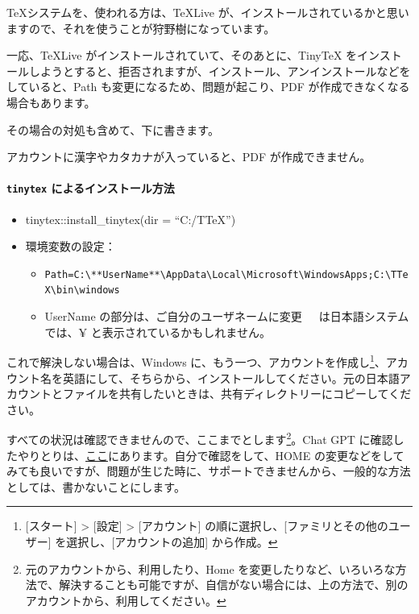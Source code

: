 \documentclass[
]{bxjsbook}
\providecommand{\tightlist}{%
  \setlength{\itemsep}{0pt}\setlength{\parskip}{0pt}}
\theoremstyle{definition}
\theoremstyle{definition}
\theoremstyle{definition}
\theoremstyle{definition}
\theoremstyle{remark}
\begin{document}
\TeX システムを、使われる方は、TeXLive が、インストールされているかと思いますので、それを使うことが狩野樹になっています。

一応、TeXLive がインストールされていて、そのあとに、TinyTeX をインストールしようとすると、拒否されますが、インストール、アンインストールなどをしていると、Path も変更になるため、問題が起こり、PDF が作成できなくなる場合もあります。

その場合の対処も含めて、下に書きます。

アカウントに漢字やカタカナが入っていると、PDF が作成できません。

\hypertarget{tinytex-ux306bux3088ux308bux30a4ux30f3ux30b9ux30c8ux30fcux30ebux65b9ux6cd5}{%
\paragraph{\texorpdfstring{\texttt{tinytex} によるインストール方法}{tinytex によるインストール方法}}\label{tinytex-ux306bux3088ux308bux30a4ux30f3ux30b9ux30c8ux30fcux30ebux65b9ux6cd5}}

\begin{itemize}
\tightlist
\item
  tinytex::install\_tinytex(dir = ``C:/TTeX'')
\item
  環境変数の設定：

  \begin{itemize}
  \tightlist
  \item
    \texttt{Path=C:\textbackslash{}**UserName**\textbackslash{}AppData\textbackslash{}Local\textbackslash{}Microsoft\textbackslash{}WindowsApps;C:\textbackslash{}TTeX\textbackslash{}bin\textbackslash{}windows}
  \item
    UserName の部分は、ご自分のユーザネームに変更　~は日本語システムでは、¥ と表示されているかもしれません。
  \end{itemize}
\end{itemize}

これで解決しない場合は、Windows に、もう一つ、アカウントを作成し\footnote{{[}スタート{]} \textgreater{} {[}設定{]} \textgreater{} {[}アカウント{]} の順に選択し、{[}ファミリとその他のユーザー{]} を選択し、{[}アカウントの追加{]} から作成。}、アカウント名を英語にして、そちらから、インストールしてください。元の日本語アカウントとファイルを共有したいときは、共有ディレクトリーにコピーしてください。

すべての状況は確認できませんので、ここまでとします\footnote{元のアカウントから、利用したり、Home を変更したりなど、いろいろな方法で、解決することも可能ですが、自信がない場合には、上の方法で、別のアカウントから、利用してください。}。Chat GPT に確認したやりとりは、\href{https://icu-hsuzuki.github.io/ds_education/chatgpt.html\#chatgpt}{ここ}にあります。自分で確認をして、HOME の変更などをしてみても良いですが、問題が生じた時に、サポートできませんから、一般的な方法としては、書かないことにします。
\end{document}
